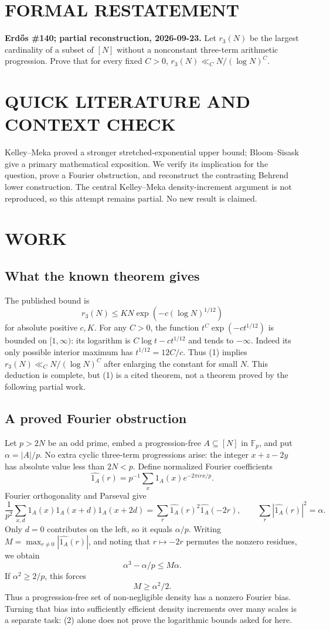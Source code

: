 \section{FORMAL RESTATEMENT}
\textbf{Erd\H{o}s \#140; partial reconstruction, 2026-09-23.}
Let $r_3(N)$ be the largest cardinality of a subset of $[N]$ without a
nonconstant three-term arithmetic progression. Prove that for every
fixed $C>0$, $r_3(N)\ll_C N/(\log N)^C$.

\section{QUICK LITERATURE AND CONTEXT CHECK}
Kelley--Meka proved a stronger stretched-exponential upper bound;
Bloom--Sisask give a primary mathematical exposition. We verify its
implication for the question, prove a Fourier obstruction, and
reconstruct the contrasting Behrend lower construction. The central
Kelley--Meka density-increment argument is not reproduced, so this
attempt remains partial. No new result is claimed.

\section{WORK}
\subsection*{What the known theorem gives}
The published bound is
\[
 r_3(N)\le K N\exp(-c(\log N)^{1/12})                     \tag{1}
\]
for absolute positive $c,K$. For any $C>0$, the function
$t^C\exp(-ct^{1/12})$ is bounded on $[1,\infty)$: its logarithm
is $C\log t-ct^{1/12}$ and tends to $-\infty$.
Indeed its only possible interior maximum has
$t^{1/12}=12C/c$. Thus (1) implies
$r_3(N)\ll_C N/(\log N)^C$ after enlarging the constant for small $N$.
This deduction is complete, but (1) is a cited theorem, not a theorem
proved by the following partial work.

\subsection*{A proved Fourier obstruction}
Let $p>2N$ be an odd prime, embed a progression-free $A\subseteq[N]$
in $\mathbb F_p$, and put $\alpha=|A|/p$. No extra cyclic three-term
progressions arise: the integer $x+z-2y$ has absolute value less than
$2N<p$. Define normalized Fourier coefficients
\[
 \widehat{1_A}(r)=p^{-1}\sum_x1_A(x)e^{-2\pi irx/p}.
\]
Fourier orthogonality and Parseval give
\[
 \frac1{p^2}\sum_{x,d}1_A(x)1_A(x+d)1_A(x+2d)
   =\sum_r\widehat{1_A}(r)^2\widehat{1_A}(-2r),\qquad
 \sum_r|\widehat{1_A}(r)|^2=\alpha.
\]
Only $d=0$ contributes on the left, so it equals $\alpha/p$.
Writing $M=\max_{r\ne0}|\widehat{1_A}(r)|$, and noting that
$r\mapsto-2r$ permutes the nonzero residues, we obtain
\[
 \alpha^3-\alpha/p\le M\alpha.
\]
If $\alpha^2\ge2/p$, this forces
\[
 M\ge\alpha^2/2.                                         \tag{2}
\]
Thus a progression-free set of non-negligible density has a nonzero
Fourier bias. Turning that bias into sufficiently efficient density
increments over many scales is a separate task: (2) alone does not
prove the logarithmic bounds asked for here.

